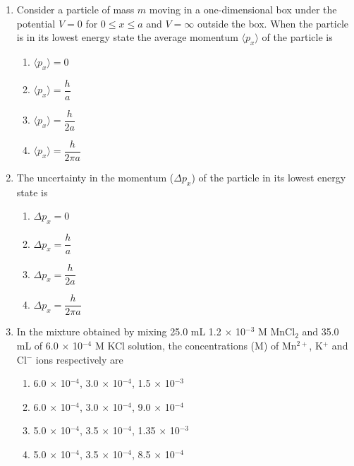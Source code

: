 \documentclass[journal,12pt,onecolumn]{IEEEtran}
\theoremstyle{remark}
\begin{document}
\begin{enumerate}
\item  Consider a particle of mass $m$ moving in a one-dimensional box under the potential $V=0$ for $0 \le x \le a$ and $V = \infty$ outside the box. When the particle is in its lowest energy state the average momentum $\langle p_x \rangle$ of the particle is \hfill{}
\begin{multicols}{2}
\begin{enumerate}
    \item $\langle p_x \rangle = 0$
    \item $\langle p_x \rangle = \dfrac{h}{a}$
    \item $\langle p_x \rangle = \dfrac{h}{2a}$
    \item $\langle p_x \rangle = \dfrac{h}{2\pi a}$
\end{enumerate}
\end{multicols}


\item  The uncertainty in the momentum ($\Delta p_x$) of the particle in its lowest energy state is \hfill{}
\begin{multicols}{2}
\begin{enumerate}
    \item $\Delta p_x = 0$
    \item $\Delta p_x = \dfrac{h}{a}$
    \item $\Delta p_x = \dfrac{h}{2a}$
    \item $\Delta p_x = \dfrac{h}{2\pi a}$
\end{enumerate}
\end{multicols}



\item  In the mixture obtained by mixing 25.0 mL 1.2 $\times$ 10$^{-3}$ M MnCl$_2$ and 35.0 mL of 6.0 $\times$ 10$^{-4}$ M KCl solution, the concentrations (M) of Mn$^{2+}$, K$^+$ and Cl$^-$ ions respectively are \hfill{}
\begin{multicols}{2}
\begin{enumerate}
    \item 6.0 $\times$ 10$^{-4}$, 3.0 $\times$ 10$^{-4}$, 1.5 $\times$ 10$^{-3}$
    \item 6.0 $\times$ 10$^{-4}$, 3.0 $\times$ 10$^{-4}$, 9.0 $\times$ 10$^{-4}$
    \item 5.0 $\times$ 10$^{-4}$, 3.5 $\times$ 10$^{-4}$, 1.35 $\times$ 10$^{-3}$
    \item 5.0 $\times$ 10$^{-4}$, 3.5 $\times$ 10$^{-4}$, 8.5 $\times$ 10$^{-4}$
\end{enumerate}
\end{multicols}


\end{enumerate}
\end{document}
